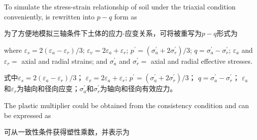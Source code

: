 \begin{ParaColumn}
    
    To simulate the stress-strain relationship of soil under the triaxial condition conveniently,  is rewritten into $p-q$ form as

    \switchcolumn

    为了方便地模拟三轴条件下土体的应力-应变关系，可将被重写为$p-q$形式为

    \switchcolumn*

    \noindent
    where $\varepsilon_{s}=2\left(\varepsilon_{a}-\varepsilon_{r}\right) / 3$; $\varepsilon_{v}=2 \varepsilon_{a}+\varepsilon_{r}$; $p^{\prime}=\left(\sigma_{a}^{\prime}+2 \sigma_{r}^{\prime}\right) / 3$; $q=\sigma_{a}^{\prime}-\sigma_{r}^{\prime}$; $\varepsilon_{a}$ and $\varepsilon_{r}=$ axial and radial strains; and $\sigma_{a}^{\prime}$ and $\sigma_{r}^{\prime}=$ axial and radial effective stresses.

    \switchcolumn

    \noindent
    式中$\varepsilon_{s}=2\left(\varepsilon_{a}-\varepsilon_{r}\right) / 3$； $\varepsilon_{v}=2 \varepsilon_{a}+\varepsilon_{r}$; $p^{\prime}=\left(\sigma_{a}^{\prime}+2 \sigma_{r}^{\prime}\right) / 3$； $q=\sigma_{a}^{\prime}-\sigma_{r}^{\prime}$； $\varepsilon_{a}$和$\varepsilon_{r}$为轴向和径向应变；$\sigma_{a}^{\prime}$和$\sigma_{r}^{\prime}$为轴向和径向有效应力。

    \switchcolumn*

    The plastic multiplier could be obtained from the consistency condition and can be expressed as

    \switchcolumn

    可从一致性条件获得塑性乘数，并表示为

    \switchcolumn*


\end{ParaColumn}
